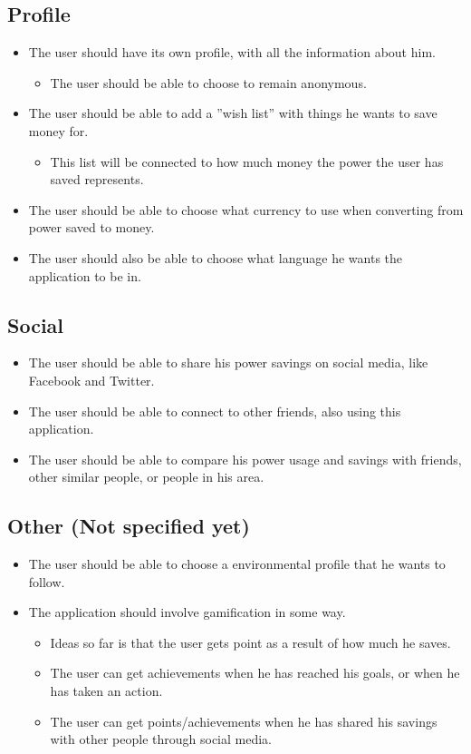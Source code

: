 \subsection{Profile}

\begin{itemize}
\item The user should have its own profile, with all the information about him.
\begin{itemize}
\item The user should be able to choose to remain anonymous.
\end{itemize}
\item The user should be able to add a ''wish list'' with things he wants to save money for.
\begin{itemize}
\item This list will be connected to how much money the power the user has saved represents.
\end{itemize}
\item The user should be able to choose what currency to use when converting from power saved to money.
\item The user should also be able to choose what language he wants the application to be in.
\end{itemize}


\subsection{Social}
\begin{itemize}
\item The user should be able to share his power savings on social media, like Facebook and Twitter.
\item The user should be able to connect to other friends, also using this application.
\item The user should be able to compare his power usage and savings with friends, other similar people, or people in his area.
\end{itemize}

\subsection{Other (Not specified yet)}
\begin{itemize}
\item The user should be able to choose a environmental profile that he wants to follow.
\item The application should involve gamification in some way.
\begin{itemize}
\item Ideas so far is that the user gets point as a result of how much he saves.
\item The user can get achievements when he has reached his goals, or when he has taken an action.
\item The user can get points/achievements when he has shared his savings with other people through social media.
\end{itemize}
\end{itemize}


